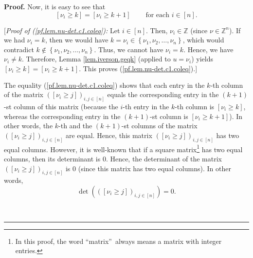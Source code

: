 \documentclass[numbers=enddot,12pt,final,onecolumn,notitlepage,english]{scrartcl}%
\theoremstyle{definition}
\newenvironment{proof}[1][Proof]{\noindent\textbf{#1.} }{\ \rule{0.5em}{0.5em}}
\newenvironment{verlong}{}{}
\begin{document}
\begin{proof}
\begin{verlong}
Now, it is easy to see that
\begin{equation}
\left[  \nu_{i}\geq k\right]  =\left[  \nu_{i}\geq k+1\right]
\ \ \ \ \ \ \ \ \ \ \text{for each }i\in\left[  n\right]  .
\label{pf.lem.nu-det.c1.coleq}%
\end{equation}


[\textit{Proof of (\ref{pf.lem.nu-det.c1.coleq}):} Let $i\in\left[  n\right]
$. Then, $\nu_{i}\in\mathbb{Z}$ (since $\nu\in\mathbb{Z}^{n}$). If we had
$\nu_{i}=k$, then we would have $k=\nu_{i}\in\left\{  \nu_{1},\nu_{2}%
,\ldots,\nu_{n}\right\}  $, which would contradict $k\notin\left\{  \nu
_{1},\nu_{2},\ldots,\nu_{n}\right\}  $. Thus, we cannot have $\nu_{i}=k$.
Hence, we have $\nu_{i}\neq k$. Therefore, Lemma \ref{lem.iverson.geqk}
(applied to $u=\nu_{i}$) yields $\left[  \nu_{i}\geq k\right]  =\left[
\nu_{i}\geq k+1\right]  $. This proves (\ref{pf.lem.nu-det.c1.coleq}).]
\medskip

The equality (\ref{pf.lem.nu-det.c1.coleq}) shows that each entry in the
$k$-th column of the matrix $\left(  \left[  \nu_{i}\geq j\right]  \right)
_{i,j\in\left[  n\right]  }$ equals the corresponding entry in the $\left(
k+1\right)  $-st column of this matrix (because the $i$-th entry in the $k$-th
column is $\left[  \nu_{i}\geq k\right]  $, whereas the corresponding entry in
the $\left(  k+1\right)  $-st column is $\left[  \nu_{i}\geq k+1\right]  $).
In other words, the $k$-th and the $\left(  k+1\right)  $-st columns of the
matrix $\left(  \left[  \nu_{i}\geq j\right]  \right)  _{i,j\in\left[
n\right]  }$ are equal. Hence, this matrix $\left(  \left[  \nu_{i}\geq
j\right]  \right)  _{i,j\in\left[  n\right]  }$ has two equal columns.
However, it is well-known that if a square matrix\footnote{In this proof, the
word \textquotedblleft matrix\textquotedblright\ always means a matrix with
integer entries.} has two equal columns, then its determinant is $0$. Hence,
the determinant of the matrix $\left(  \left[  \nu_{i}\geq j\right]  \right)
_{i,j\in\left[  n\right]  }$ is $0$ (since this matrix has two equal columns).
In other words,
\begin{equation}
\det\left(  \left(  \left[  \nu_{i}\geq j\right]  \right)  _{i,j\in\left[
n\right]  }\right)  =0. \label{pf.lem.nu-det.c1.det=0}%
\end{equation}



\end{verlong}
\end{proof}
\end{document}
